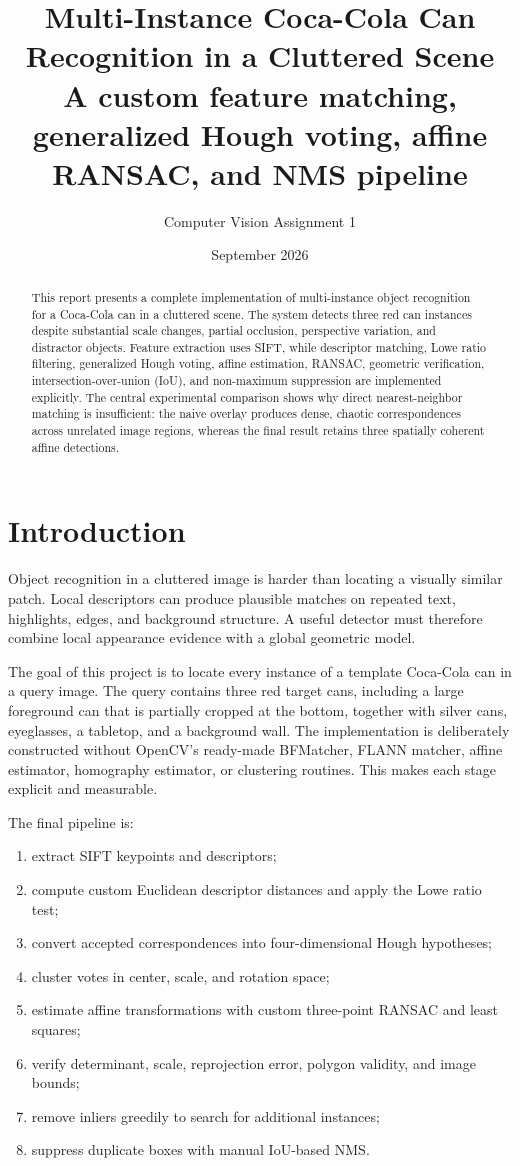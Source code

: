\documentclass[10pt,twocolumn]{article}
\title{\textbf{Multi-Instance Coca-Cola Can Recognition in a Cluttered Scene}\\
\large A custom feature matching, generalized Hough voting, affine RANSAC, and NMS pipeline}
\author{Computer Vision Assignment 1}
\date{September 2026}
\begin{document}
\maketitle

\begin{abstract}
This report presents a complete implementation of multi-instance object recognition for a Coca-Cola can in a cluttered scene. The system detects three red can instances despite substantial scale changes, partial occlusion, perspective variation, and distractor objects. Feature extraction uses SIFT, while descriptor matching, Lowe ratio filtering, generalized Hough voting, affine estimation, RANSAC, geometric verification, intersection-over-union (IoU), and non-maximum suppression are implemented explicitly. The central experimental comparison shows why direct nearest-neighbor matching is insufficient: the naive overlay produces dense, chaotic correspondences across unrelated image regions, whereas the final result retains three spatially coherent affine detections.
\end{abstract}

\section{Introduction}
Object recognition in a cluttered image is harder than locating a visually similar patch. Local descriptors can produce plausible matches on repeated text, highlights, edges, and background structure. A useful detector must therefore combine local appearance evidence with a global geometric model.

The goal of this project is to locate every instance of a template Coca-Cola can in a query image. The query contains three red target cans, including a large foreground can that is partially cropped at the bottom, together with silver cans, eyeglasses, a tabletop, and a background wall. The implementation is deliberately constructed without OpenCV's ready-made BFMatcher, FLANN matcher, affine estimator, homography estimator, or clustering routines. This makes each stage explicit and measurable.

The final pipeline is:
\begin{enumerate}
  \item extract SIFT keypoints and descriptors;
  \item compute custom Euclidean descriptor distances and apply the Lowe ratio test;
  \item convert accepted correspondences into four-dimensional Hough hypotheses;
  \item cluster votes in center, scale, and rotation space;
  \item estimate affine transformations with custom three-point RANSAC and least squares;
  \item verify determinant, scale, reprojection error, polygon validity, and image bounds;
  \item remove inliers greedily to search for additional instances;
  \item suppress duplicate boxes with manual IoU-based NMS.
\end{enumerate}
\end{document}
